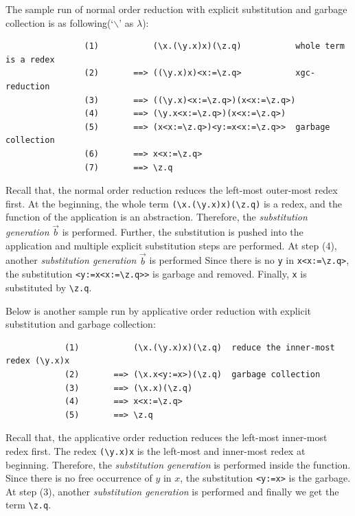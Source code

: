 \begin{exmp}
\normalfont The sample run of normal order reduction with explicit substitution and garbage collection is as following(`$\backslash$' as $\lambda$):
\end{exmp}
\begin{verbatim}
                (1)           (\x.(\y.x)x)(\z.q)           whole term is a redex
                (2)       ==> ((\y.x)x)<x:=\z.q>           xgc-reduction
                (3)       ==> ((\y.x)<x:=\z.q>)(x<x:=\z.q>)
                (4)       ==> (\y.x<x:=\z.q>)(x<x:=\z.q>)
                (5)       ==> (x<x:=\z.q>)<y:=x<x:=\z.q>>  garbage collection
                (6)       ==> x<x:=\z.q>
                (7)       ==> \z.q          
\end{verbatim}

Recall that, the normal order reduction reduces the left-most outer-most redex first. At the beginning, the whole term \verb|(\x.(\y.x)x)(\z.q)| is a redex, and the function of the application is an abstraction. Therefore, the \textit{substitution generation} $\overrightarrow{b}$ is performed. Further, the substitution is pushed into the application and multiple explicit substitution steps are performed. At step (4), another \textit{substitution generation} $\overrightarrow{b}$ is performed Since there is no \texttt{y} in \verb|x<x:=\z.q>|, the substitution \verb|<y:=x<x:=\z.q>>| is garbage and removed. Finally, \texttt{x} is substituted by \verb|\z.q|.

\begin{exmp}
\normalfont Below is another sample run by applicative order reduction with explicit substitution and garbage collection:
\end{exmp}
\begin{verbatim}
            (1)           (\x.(\y.x)x)(\z.q)  reduce the inner-most redex (\y.x)x
            (2)       ==> (\x.x<y:=x>)(\z.q)  garbage collection
            (3)       ==> (\x.x)(\z.q)
            (4)       ==> x<x:=\z.q>
            (5)       ==> \z.q
\end{verbatim}

Recall that, the applicative order reduction reduces the left-most inner-most redex first. The redex \verb|(\y.x)x| is the left-most and inner-most redex at beginning. Therefore, the \textit{substitution generation} is performed inside the function. Since there is no free occurrence of $y$ in $x$, the substitution \verb|<y:=x>| is the garbage. At step (3), another \textit{substitution generation} is performed and finally we get the term \verb|\z.q|. 


